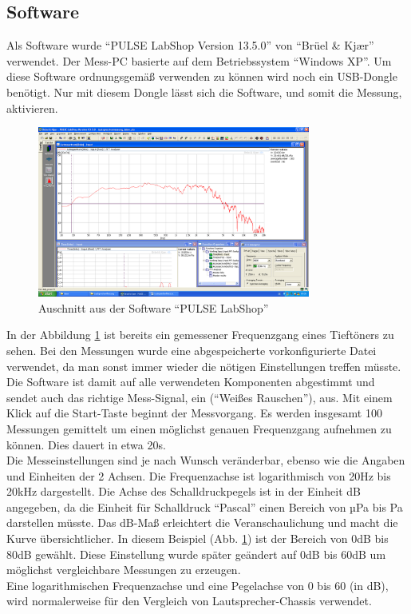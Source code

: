 \subsection*{Software}\label{subsec:4.1.1}
Als Software wurde \enquote{PULSE LabShop Version 13.5.0} von \enquote{Brüel \& Kj\ae r} verwendet.
Der Mess-PC basierte auf dem Betriebssystem \enquote{Windows XP}.
Um diese Software ordnungsgemäß verwenden zu können wird noch ein USB-Dongle benötigt.
Nur mit diesem Dongle lässt sich die Software, und somit die Messung, aktivieren.
\begin{figure} [H]
	\centering
	\includegraphics[width=0.8\textwidth]{img/LSMessung/VisatonMitSilikonMitWolle.png}
	\caption{Auschnitt aus der Software \enquote{PULSE LabShop}}
	\label{fig:4.1.1.1}
\end{figure}
In der Abbildung \ref{fig:4.1.1.1} ist bereits ein gemessener Frequenzgang eines Tieftöners zu sehen. Bei den Messungen wurde eine abgespeicherte vorkonfigurierte Datei verwendet, da man sonst immer wieder die nötigen Einstellungen treffen müsste.
Die Software ist damit auf alle verwendeten Komponenten abgestimmt und sendet auch das richtige Mess-Signal, ein (\enquote{Weißes Rauschen}), aus.
Mit einem Klick auf die Start-Taste beginnt der Messvorgang.
Es werden insgesamt 100 Messungen gemittelt um einen möglichst genauen Frequenzgang aufnehmen zu können.
Dies dauert in etwa 20s.
\\
Die Messeinstellungen sind je nach Wunsch veränderbar, ebenso wie die Angaben und Einheiten der 2 Achsen.
Die Frequenzachse ist logarithmisch von 20Hz bis 20kHz dargestellt.
Die Achse des Schalldruckpegels ist in der Einheit dB angegeben, da die Einheit für Schalldruck \enquote{Pascal} einen Bereich von µPa bis Pa darstellen müsste.
Das dB-Maß erleichtert die Veranschaulichung und macht die Kurve übersichtlicher.
In diesem Beispiel (Abb. \ref{fig:4.1.1.1}) ist der Bereich von 0dB bis 80dB gewählt.
Diese Einstellung wurde später geändert auf 0dB bis 60dB um möglichst vergleichbare Messungen zu erzeugen.\\
Eine logarithmischen Frequenzachse und eine Pegelachse von 0 bis 60 (in dB), wird normalerweise für den Vergleich von Lautsprecher-Chassis verwendet.

